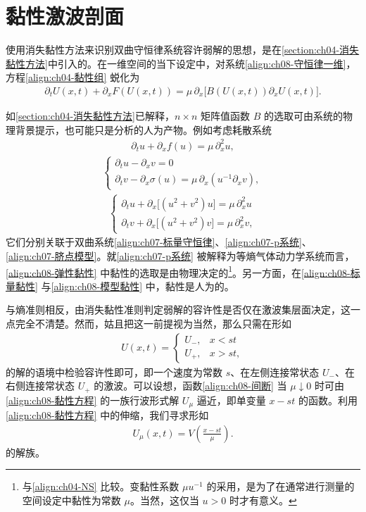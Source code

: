 \documentclass[../../main.tex]{subfiles}
\begin{document}
\section{黏性激波剖面}\label{section:ch08-黏性激波剖面}

使用消失黏性方法来识别双曲守恒律系统容许弱解的思想，是在\cref{section:ch04-消失黏性方法}中引入的。在一维空间的当下设定中，对系统\eqref{align:ch08-守恒律一维}，方程\eqref{align:ch04-黏性组} 蜕化为
\begin{align}
\partial_t U(x,t)+\partial_x F(U(x,t))=\mu\,\partial_x\big[B(U(x,t))\partial_x U(x,t)\big].
\label{align:ch08-黏性方程}
\end{align}

如\cref{section:ch04-消失黏性方法}已解释，$n\times n$ 矩阵值函数 $B$ 的选取可由系统的物理背景提示，也可能只是分析的人为产物。例如考虑耗散系统
\begin{align}
\partial_t u+\partial_x f(u)=\mu\,\partial_x^2 u,
\label{align:ch08-标量黏性}
\end{align}
\begin{align}
\begin{cases}
\partial_t u-\partial_x v=0\\
\partial_t v-\partial_x\sigma(u)=\mu\,\partial_x(u^{-1}\partial_x v),
\end{cases}
\label{align:ch08-弹性黏性}
\end{align}
\begin{align}
\begin{cases}
\partial_t u+\partial_x\big[(u^2+v^2)u\big]=\mu\,\partial_x^2 u\\
\partial_t v+\partial_x\big[(u^2+v^2)v\big]=\mu\,\partial_x^2 v,
\end{cases}
\label{align:ch08-模型黏性}
\end{align}
它们分别关联于双曲系统\eqref{align:ch07-标量守恒律}、\eqref{align:ch07-p系统}、\eqref{align:ch07-脐点模型}。就\eqref{align:ch07-p系统} 被解释为等熵气体动力学系统而言，\eqref{align:ch08-弹性黏性} 中黏性的选取是由物理决定的\footnote{与\eqref{align:ch04-NS} 比较。变黏性系数 $\mu u^{-1}$ 的采用，是为了在通常进行测量的空间设定中黏性为常数 $\mu$。当然，这仅当 $u>0$ 时才有意义。}。另一方面，在\eqref{align:ch08-标量黏性} 与\eqref{align:ch08-模型黏性} 中，黏性是人为的。

与熵准则相反，由消失黏性准则判定弱解的容许性是否仅在激波集层面决定，这一点完全不清楚。然而，姑且把这一前提视为当然，那么只需在形如
\begin{align}
U(x,t)=
\begin{cases}
U_-,&x<st\\
U_+,&x>st,
\end{cases}
\label{align:ch08-间断}
\end{align}
的解的语境中检验容许性即可，即一个速度为常数 $s$、在左侧连接常状态 $U_-$、在右侧连接常状态 $U_+$ 的激波。可以设想，函数\eqref{align:ch08-间断} 当 $\mu\downarrow0$ 时可由\eqref{align:ch08-黏性方程} 的一族行波形式解 $U_\mu$ 逼近，即单变量 $x-st$ 的函数。利用\eqref{align:ch08-黏性方程} 中的伸缩，我们寻求形如
\begin{align}
U_\mu(x,t)=V\!\left(\frac{x-st}{\mu}\right).
\label{align:ch08-行波形式}
\end{align}
的解族。
\end{document}
